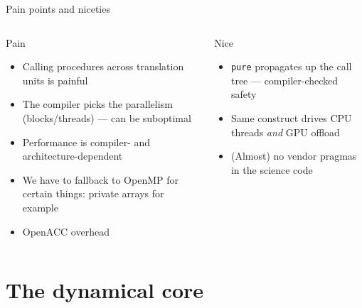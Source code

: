 \documentclass[aspectratio=169]{beamer}
\begin{document}
\begin{frame}{Pain points and niceties}
  \begin{columns}[T,onlytextwidth]
      \begin{alertblock}{Pain}
        \begin{itemize}
          \item Calling procedures across translation units is painful
          \item The compiler picks the parallelism (blocks/threads) --- can be suboptimal
          \item Performance is compiler- and architecture-dependent
          \item We have to fallback to OpenMP for certain things: private arrays for example
          \item OpenACC overhead
        \end{itemize}
      \end{alertblock}
      \begin{exampleblock}{Nice}
        \begin{itemize}
          \item \texttt{pure} propagates up the call tree --- compiler-checked safety
          \item Same construct drives CPU threads \emph{and} GPU offload
          \item (Almost) no vendor pragmas in the science code
        \end{itemize}
      \end{exampleblock}
  \end{columns}
\end{frame}

\section{The dynamical core}
\end{document}
